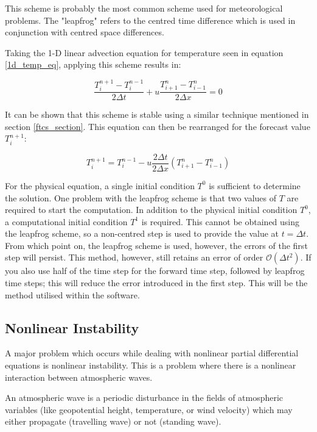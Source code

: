 This scheme is probably the most common scheme used for meteorological problems. The "leapfrog" refers to the centred
time difference which is used in conjunction with centred space differences. 

Taking the 1-D linear advection equation for temperature seen in equation \ref{1d_temp_eq}, applying this scheme results in:

\begin{equation}
    \frac{T^{n+1}_{i} - T^{n-1}_{i}}{2 \Delta t} + u \frac{T^{n}_{i+1} - T^{n}_{i-1}}{2 \Delta x} = 0
\end{equation}

It can be shown that this scheme is stable using a similar technique mentioned in section \ref{ftcs_section}. This equation can then be rearranged for the forecast value $T^{n+1}_{i}$\cite{ftcs_leapfrog}:

\begin{equation}
    T^{n+1}_{i} = T^{n-1}_{i} - u \frac{2 \Delta t}{2 \Delta x}(T^{n}_{i+1} - T^{n}_{i-1})
\end{equation}

For the physical equation, a single initial condition $T^{0}$ is sufficient to determine the solution. One problem with the leapfrog scheme is that two values of $T$ are required to start the computation. In addition to the physical initial condition $T^{0}$, a computational initial condition $T^{1}$ is required. This cannot be obtained using the leapfrog scheme, so a non-centred step is used to provide the value at $t = \Delta t$. From which point on, the leapfrog scheme is used, however, the errors of the first step will persist. This method, however, still retains an error of order $\mathcal{O}(\Delta t^2)$. If you also use half of the time step for the forward time step, followed by leapfrog time steps; this will reduce the error introduced in the first step\cite{leapfrog_slides_two}. This will be the method utilised within the software.

\subsection{Nonlinear Instability}
A major problem which occurs while dealing with nonlinear partial differential equations is nonlinear instability. This is a problem where there is a nonlinear interaction between atmospheric waves\cite{nonlinear_instability}.  

\begin{definition}
An atmospheric wave is a periodic disturbance in the fields of atmospheric variables (like geopotential height, temperature, or wind velocity) which may either propagate (travelling wave) or not (standing wave).
\end{definition}

